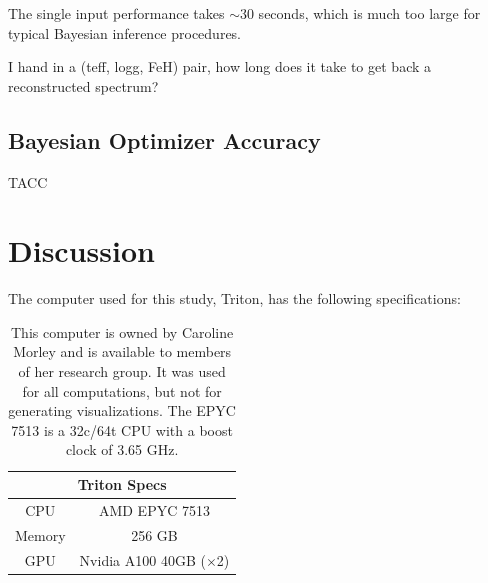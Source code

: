 \documentclass[twocolumn]{aastex631}
\begin{document}
The single input performance 
takes $\sim$30 seconds, which is much too large for typical Bayesian inference procedures.

I hand in a (teff, logg, FeH) pair, how long does it take to get back a reconstructed spectrum?

\subsection{Bayesian Optimizer Accuracy}
TACC

\section{Discussion}
The computer used for this study, Triton, has the following specifications:
\begin{table}[h!]
    \hspace*{0.6cm}\begin{tabular}{|c|c|}
        \hline
        \multicolumn{2}{|c|}{\textbf{Triton Specs}}\\
        \hline\hline
        CPU & AMD EPYC 7513\\
        Memory & 256 GB\\
        GPU & Nvidia A100 40GB ($\times$2)\\
        \hline
    \end{tabular}
    \caption{This computer is owned by Caroline Morley and is available to
    members of her research group. It was used for all computations, but not 
    for generating visualizations. The EPYC 7513 is a 32c/64t CPU with a 
    boost clock of 3.65 GHz.}
\end{table}
\end{document}
